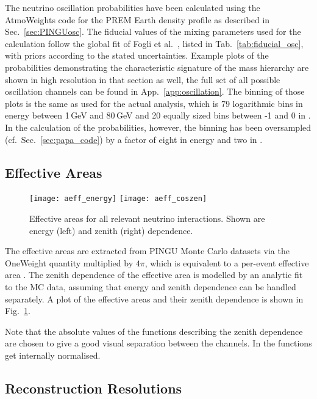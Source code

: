The neutrino oscillation probabilities have been calculated using the
AtmoWeights code for the PREM Earth density profile as described in
Sec.~\ref{sec:PINGUosc}. The fiducial values of the mixing parameters used for
the calculation follow the global fit of Fogli et al.\ \cite{Fogli}, listed in
Tab.~\ref{tab:fiducial_osc}, with priors according to the stated uncertainties.
Example plots of the probabilities demonstrating
the characteristic signature of the mass hierarchy are shown in high resolution
in that section as well, the full set of all possible oscillation channels can
be found in App.~\ref{app:oscillation}. The binning of those plots is the same
as used for the actual analysis, which is 79 logarithmic bins in energy between
1\,GeV and 80\,GeV and 20 equally sized bins between -1 and 0 in \coszen. In
the calculation of the probabilities, however, the binning has been oversampled
(cf.\ Sec.~\ref{sec:papa_code}) by a factor of eight in energy and two in
\coszen.

\subsection{Effective Areas}
\label{sec:input_aeff}

\begin{figure}[htbp]
 \centering
 \texttt{[image: aeff\_energy]}
 \texttt{[image: aeff\_coszen]}
 \caption{Effective areas for all relevant neutrino interactions. Shown are
  energy (left)  and zenith (right) dependence.}
\label{fig:aeffs}
\end{figure}

\noindent
The effective areas are extracted from PINGU Monte Carlo datasets via the
OneWeight quantity multiplied by $4\pi$, which is equivalent to a per-event
effective area \cite{OneWeight}. The zenith dependence of the effective area is
modelled by an analytic fit to the MC data, assuming that energy and zenith
dependence can be handled separately. A plot of the effective areas and their
zenith dependence is shown in Fig.~\ref{fig:aeffs}. 

Note that the absolute values of the functions describing the zenith dependence 
are chosen to give a good visual separation between the channels. In \papa the 
functions get internally normalised. 

\subsection{Reconstruction Resolutions}
\label{sec:input_reco}

